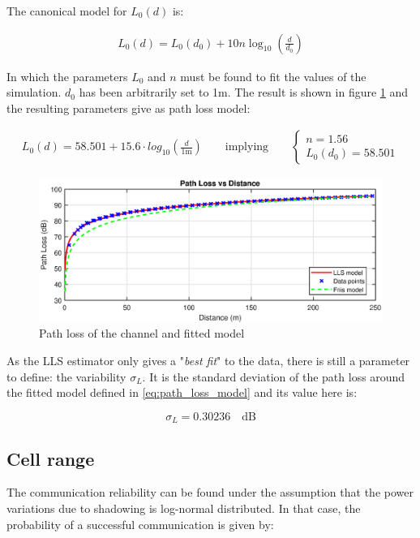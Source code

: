\documentclass[10pt,a4paper]{ULBreport}
\begin{document}
The canonical model for $L_0(d)$ is:

\begin{align*}
    L_0(d) = L_0(d_0) + 10 n \log_{10} \left(\frac{d}{d_0}\right)
\end{align*}

In which the parameters $L_0$ and $n$ must be found to fit the values of the simulation. $d_0$ has been arbitrarily set to 1m. The result is shown in figure \ref{fig:path_loss} and the resulting parameters give as path loss model:

\begin{align}
    \label{eq:path_loss_model}
    L_0(d) = 58.501 + 15.6 \cdot log_{10} \left(\frac{d}{1\text{m}}\right)
    \qquad
    \text{implying} \qquad \left\{
    \begin{array}{l}
        n = 1.56 \\
        L_0(d_0) = 58.501
    \end{array}
    \right.
\end{align}

\begin{figure}[H]
    \centering
    \includegraphics[width=1\textwidth]{3_5_model.eps}
    \caption{Path loss of the channel and fitted model}
    \label{fig:path_loss}
\end{figure}

As the LLS estimator only gives a "\textit{best fit}" to the data, there is still a parameter to define: the variability $\sigma_L$. It is the standard deviation of the path loss around the fitted model defined in \ref{eq:path_loss_model} and its value here is:

\begin{equation*}
    \sigma_L = 0.30236 \quad \text{dB}
\end{equation*}

\subsection{Cell range}
\label{sec:cell_range}
The communication reliability can be found under the assumption that the power variations due to shadowing is log-normal distributed. In that case, the probability of a successful communication is given by:
\end{document}
